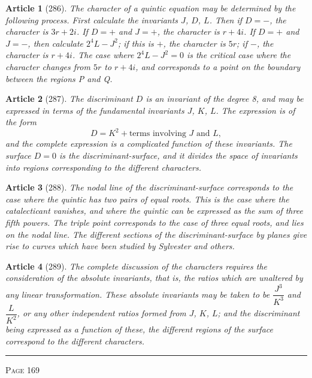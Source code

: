 \documentclass[11pt,a4paper]{article}
\theoremstyle{cayley}
\newtheorem{art}{Article}
\begin{document}
\begin{art}[286]
The character of a quintic equation may be determined by the following process. First calculate the invariants $J$, $D$, $L$. Then if $D=-$, the character is $3r+2i$. If $D=+$ and $J=+$, the character is $r+4i$. If $D=+$ and $J=-$, then calculate $2^4L-J^2$; if this is $+$, the character is $5r$; if $-$, the character is $r+4i$. The case where $2^4L-J^2=0$ is the critical case where the character changes from $5r$ to $r+4i$, and corresponds to a point on the boundary between the regions P and Q.
\end{art}

\begin{art}[287]
The discriminant $D$ is an invariant of the degree 8, and may be expressed in terms of the fundamental invariants $J$, $K$, $L$. The expression is of the form
\[
D = K^2 + \text{terms involving } J \text{ and } L,
\]
and the complete expression is a complicated function of these invariants. The surface $D=0$ is the discriminant-surface, and it divides the space of invariants into regions corresponding to the different characters.
\end{art}

\begin{art}[288]
The nodal line of the discriminant-surface corresponds to the case where the quintic has two pairs of equal roots. This is the case where the catalecticant vanishes, and where the quintic can be expressed as the sum of three fifth powers. The triple point corresponds to the case of three equal roots, and lies on the nodal line. The different sections of the discriminant-surface by planes give rise to curves which have been studied by Sylvester and others.
\end{art}

\begin{art}[289]
The complete discussion of the characters requires the consideration of the absolute invariants, that is, the ratios which are unaltered by any linear transformation. These absolute invariants may be taken to be $\dfrac{J^3}{K^3}$ and $\dfrac{L}{K^2}$, or any other independent ratios formed from $J$, $K$, $L$; and the discriminant being expressed as a function of these, the different regions of the surface correspond to the different characters.
\end{art}

\vspace{1em}
\noindent\rule{\textwidth}{0.4pt}
\begin{center}\textsc{Page 169}\end{center}
\newpage
\end{document}
